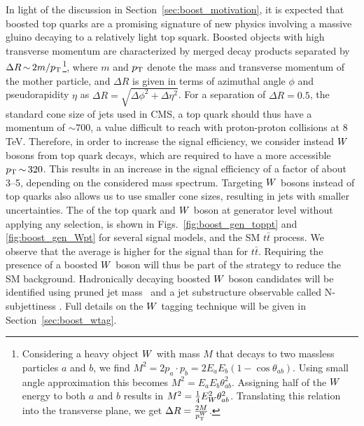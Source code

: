 

In light of the discussion in Section~\ref{sec:boost_motivation}, it is expected that boosted top
quarks are a promising signature of new physics involving a massive gluino decaying to a relatively
light top squark.
Boosted objects with high transverse momentum are characterized by merged decay products
separated by $ \Delta R \,{\sim}\, 2m/p_{\mathrm{T}}$\footnote{Considering a heavy object $W$ with mass $M$
that decays to two massless particles $a$ and $b$, we find $M^2 = 2 p_a \cdot p_b = 2 E_a E_b (1
- \cos{\theta_{ab}})$. Using small angle approximation this becomes $M^2 = E_a E_b
\theta_{ab}^2$. Assigning half of the $W$ energy to both $a$ and $b$ results in $M^2 =
\frac{1}{4} E_{W}^2 \theta_{ab}^2$. Translating this relation into the transverse plane, we get
$\Delta R = \frac{2 M}{p_{\mathrm{T}}^{W}}$.}, 
where $m$ and $p_{\mathrm{T}}$ denote the mass and transverse momentum of the mother particle, and $\Delta R$
is given in terms of azimuthal angle $\phi$ and pseudorapidity $\eta$ as $\Delta R = \sqrt{\Delta
\phi^2 + \Delta \eta^2}$.
For a separation of $\Delta R = 0.5$, the standard cone size of jets used in CMS, a top
quark should thus have a momentum of ${\sim}700$\GeV, a value difficult to reach with proton-proton
collisions at 8 TeV. 
Therefore, in order to increase the signal efficiency, we consider instead $W$ bosons from top
quark decays, which are required to have a more accessible $p_{\mathrm{T}} \,{\sim}\, 320$\GeV.  This results
in an increase in the signal efficiency of a factor of about 3--5, depending on the considered mass
spectrum. 
Targeting $W$ bosons instead of top quarks also allows us to use smaller cone sizes, resulting in
jets with smaller uncertainties.
The \pt of the top quark and $W$ boson at generator
level without applying any selection, is shown in Figs.~\ref{fig:boost_gen_toppt} and
\ref{fig:boost_gen_Wpt} for several signal models, and the SM $t\bar{t}$ process. 
We observe that the average \pt is higher for the signal than for $t\bar{t}$. Requiring the
presence of a boosted $W$ boson will thus be part of the strategy to reduce the SM background.
Hadronically decaying boosted $W$ boson candidates will be identified using pruned jet
mass~\cite{Ellis:2009su,Ellis:2009me,Chatrchyan:2013vbb} and a jet substructure observable
called N-subjettiness \cite{Thaler:2010tr}. Full details on the $W$ tagging technique will be given
in Section~\ref{sec:boost_wtag}. 

